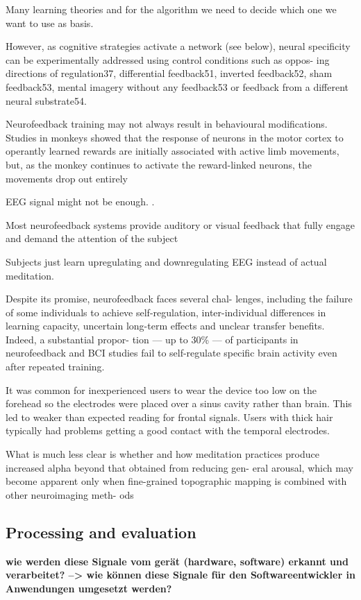 \documentclass{llncs} %
\begin{document}
Many learning theories and for the algorithm we need to decide which one we want to use as basis. 

However, as cognitive strategies activate a network (see below), neural specificity can be experimentally addressed using control conditions such as oppos- ing directions of regulation37, differential feedback51, inverted feedback52, sham feedback53, mental imagery without any feedback53 or feedback from a different neural substrate54. \cite{Sitaram}

Neurofeedback training may not always result in behavioural modifications. Studies in monkeys showed that the response of neurons in the motor cortex to operantly learned rewards are initially associated with active limb movements, but, as the monkey continues to activate the reward-linked neurons, the movements drop out entirely \cite{Sitaram}

EEG signal might not be enough. \cite{Travis}.

Most neurofeedback systems provide auditory or visual feedback that fully engage and demand the attention of the subject \cite{brand:del}

Subjects just learn upregulating and downregulating EEG instead of actual meditation.

Despite its promise, neurofeedback faces several chal- lenges, including the failure of some individuals to achieve self-regulation, inter-individual differences in learning capacity, uncertain long-term effects and unclear transfer benefits. Indeed, a substantial propor- tion — up to 30\% — of participants in neurofeedback and BCI studies fail to self-regulate specific brain activity even after repeated training.



It was common for inexperienced users to wear the device too low on the forehead so the electrodes were placed over a sinus cavity rather than brain. This led to weaker than expected reading for frontal signals. Users with thick hair typically had problems getting a good contact with the temporal electrodes. \cite{Bashivan: et al}

What is much less clear is whether and how meditation practices produce increased alpha beyond that obtained from reducing gen- eral arousal, which may become apparent only when fine-grained topographic mapping is combined with other neuroimaging meth- ods \cite{Cahn}

\subsection{Processing and evaluation}
\textbf{wie werden diese Signale vom gerät (hardware, software) erkannt und verarbeitet? --> wie können diese Signale für den Softwareentwickler in Anwendungen umgesetzt werden?}
\end{document}
